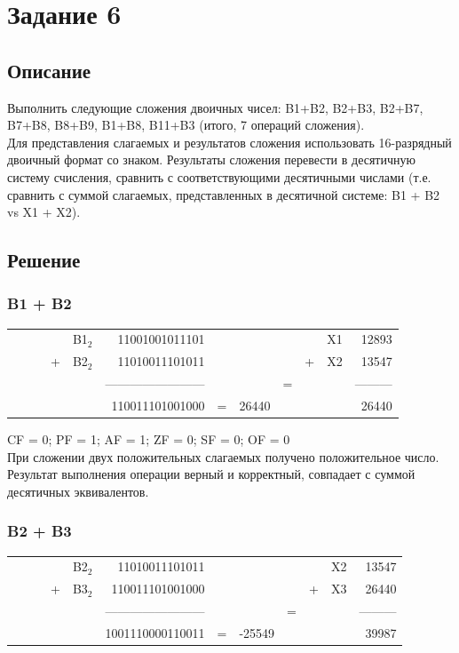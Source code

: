 \documentclass[11pt]{article}
\begin{document}
\section{Задание 6}
\label{sec:org045fd63}
\subsection{Описание}
\label{sec:org8acbd67}
Выполнить следующие сложения двоичных чисел: B1+B2, B2+B3, B2+B7, B7+B8, B8+B9, B1+B8, B11+B3 (итого, 7 операций сложения).\\
Для представления слагаемых и результатов сложения использовать 16-разрядный двоичный формат со знаком. Результаты сложения перевести в десятичную систему счисления, сравнить с соответствующими десятичными числами (т.е. сравнить с суммой слагаемых, представленных в десятичной системе: B1 + B2 vs X1 + X2).

\subsection{Решение}
\label{sec:orgcce9d84}
\subsubsection{B1 + B2}
\label{sec:org9d331c0}
\setlength{\tabcolsep}{3pt}
\label{tab:org57b63a8}
\begin{tabular}{lllllrlllllr}
 &  &  &  & B1\(_{\text{2}}\) & 11001001011101 &  &  &  &  & X1 & 12893\\
 &  &  & + & B2\(_{\text{2}}\) & 11010011101011 &  &  &  & + & X2 & 13547\\
 &  &  &  &  & ------------------------ &  &  & = &  &  & ---------\\
 &  &  &  &  & 110011101001000 & = & 26440 &  &  &  & 26440\\
\end{tabular}

CF = 0; PF = 1; AF = 1; ZF = 0; SF = 0; OF = 0\\
При сложении двух положительных слагаемых получено положительное число. Результат выполнения операции верный и корректный, совпадает с суммой десятичных эквивалентов.

\subsubsection{B2 + B3}
\label{sec:orgee7b5f3}
\setlength{\tabcolsep}{3pt}
\label{tab:org7a1384f}
\begin{tabular}{lllllrlllllr}
 &  &  &  & B2\(_{\text{2}}\) & 11010011101011 &  &  &  &  & X2 & 13547\\
 &  &  & + & B3\(_{\text{2}}\) & 110011101001000 &  &  &  & + & X3 & 26440\\
 &  &  &  &  & ------------------------ &  &  & = &  &  & ---------\\
 &  &  &  &  & 1001110000110011 & = & -25549 &  &  &  & 39987\\
\end{tabular}
\end{document}
